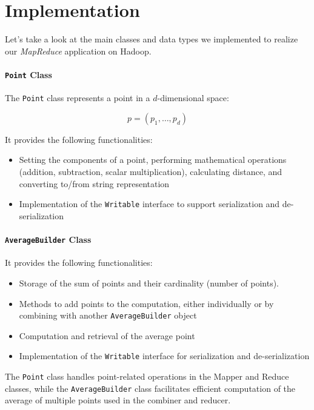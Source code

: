 \documentclass[parskip=full]{report}
\begin{document}
\section{Implementation}

Let's take a look at the main classes and data types we implemented to realize 
our \emph{MapReduce} application on Hadoop.

\paragraph{\texttt{Point} Class}

The \texttt{Point} class represents a point in a $d$-dimensional space:

\[
p = (p_1, \dots, p_d)
\]

It provides the following functionalities:

\begin{itemize}
	\item Setting the components of a point, performing mathematical operations 
	(addition, subtraction, scalar multiplication), calculating distance, and 
	converting to/from string representation
	
	\item Implementation of the \texttt{Writable} interface to support 
	serialization and de-serialization
	
\end{itemize}

\paragraph{\texttt{AverageBuilder} Class}
It provides the following functionalities:

\begin{itemize}
	\item Storage of the sum of points and their cardinality (number of points).
	\item Methods to add points to the computation, either individually or by 
	combining with another \texttt{AverageBuilder} object
	\item Computation and retrieval of the average point
	\item Implementation of the \texttt{Writable} interface for serialization 
	and de-serialization
\end{itemize}

The \texttt{Point} class handles point-related operations in the Mapper and 
Reduce classes, while the \texttt{AverageBuilder} class facilitates efficient 
computation of the average of multiple points used in the combiner and reducer.
\end{document}
